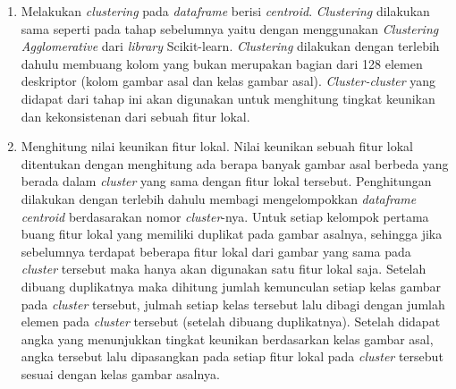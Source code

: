 \begin{enumerate}
	\item Melakukan \textit{clustering} pada \textit{dataframe} berisi \textit{centroid}. \textit{Clustering} dilakukan sama seperti pada tahap sebelumnya yaitu dengan menggunakan \textit{Clustering Agglomerative} dari \textit{library} Scikit-learn. \textit{Clustering} dilakukan dengan terlebih dahulu membuang kolom yang bukan merupakan bagian dari 128 elemen deskriptor (kolom gambar asal dan kelas gambar asal). \textit{Cluster-cluster} yang didapat dari tahap ini akan digunakan untuk menghitung tingkat keunikan dan kekonsistenan dari sebuah fitur lokal.
	\item Menghitung nilai keunikan fitur lokal. Nilai keunikan sebuah fitur lokal ditentukan dengan menghitung ada berapa banyak gambar asal berbeda yang berada dalam \textit{cluster} yang sama dengan fitur lokal tersebut. Penghitungan dilakukan dengan terlebih dahulu membagi mengelompokkan \textit{dataframe centroid} berdasarakan nomor \textit{cluster}-nya. Untuk setiap kelompok pertama buang fitur lokal yang memiliki duplikat pada gambar asalnya, sehingga jika sebelumnya terdapat beberapa fitur lokal dari gambar yang sama pada \textit{cluster} tersebut maka hanya akan digunakan satu fitur lokal saja. Setelah dibuang duplikatnya maka dihitung jumlah kemunculan setiap kelas gambar pada \textit{cluster} tersebut, julmah setiap kelas tersebut lalu dibagi dengan jumlah elemen pada \textit{cluster} tersebut (setelah dibuang duplikatnya). Setelah didapat angka yang menunjukkan tingkat keunikan berdasarkan kelas gambar asal, angka tersebut lalu dipasangkan pada setiap fitur lokal pada \textit{cluster} tersebut sesuai dengan kelas gambar asalnya. 
\end{enumerate}



